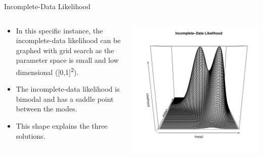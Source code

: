 \documentclass[dvipdfmx,bigger,aspectratio=169]{beamer}
\begin{document}
\begin{frame}[label={sec:orgd738e4f}]{Incomplete-Data Likelihood}
\begin{columns}
\begin{column}{0.50\columnwidth}
\begin{itemize}
\item In this specific instance, the incomplete-data likelihood can be graphed with grid search as the parameter space is small and low dimensional ([0,1]\textsuperscript{2}).
\item The incomplete-data likelihood is bimodal and has a saddle point between the modes.
\item This shape explains the three solutions.
\end{itemize}
\end{column}

\begin{column}{0.50\columnwidth}
\scriptsize
\begin{center}
\includegraphics[width=.9\linewidth]{./source/likelihood2.pdf}
\end{center}
\end{column}
\end{columns}
\end{frame}
\end{document}
